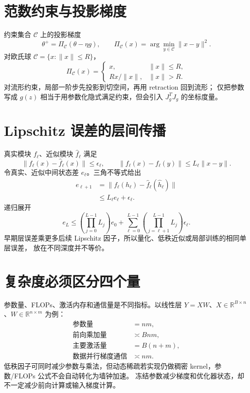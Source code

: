 \documentclass[11pt]{article}
\numberwithin{equation}{section}
\newcommand{\R}{\mathbb{R}}
\newcommand{\1}{\mathbf{1}}
\begin{document}
\section{范数约束与投影梯度}

约束集合 $\mathcal C$ 上的投影梯度
\begin{equation}
 \theta^+=\Pi_{\mathcal C}(\theta-\eta g),
 \qquad
 \Pi_{\mathcal C}(x)=\arg\min_{y\in\mathcal C}\|x-y\|^2.
\end{equation}
对欧氏球 $\mathcal C=\{x:\|x\|\le R\}$，
\begin{equation}
 \Pi_{\mathcal C}(x)=
 \begin{cases}
 x,&\|x\|\le R,\\
 Rx/\|x\|,&\|x\|>R.
 \end{cases}
\end{equation}
对流形约束，局部一阶步先投影到切空间，再用 retraction 回到流形；
仅把参数写成 $g(z)$ 相当于用参数化隐式满足约束，但会引入 $J_g^TJ_g$ 的坐标度量。

\section{Lipschitz 误差的层间传播}

真实模块 $f_\ell$、近似模块 $\widehat f_\ell$ 满足
\begin{equation}
 \|f_\ell(x)-\widehat f_\ell(x)\|\le\epsilon_\ell,
 \qquad
 \|f_\ell(x)-f_\ell(y)\|\le L_\ell\|x-y\|.
\end{equation}
令真实、近似中间状态差 $e_\ell$。三角不等式给出
\begin{align}
 e_{\ell+1}
 &=\|f_\ell(h_\ell)-\widehat f_\ell(\widehat h_\ell)\|\\
 &\le L_\ell e_\ell+\epsilon_\ell.
\end{align}
递归展开
\begin{equation}
 e_L\le
 \left(\prod_{j=0}^{L-1}L_j\right)e_0
 +\sum_{\ell=0}^{L-1}
 \left(\prod_{j=\ell+1}^{L-1}L_j\right)\epsilon_\ell.
\end{equation}
早期层误差乘更多后续 Lipschitz 因子，所以量化、低秩近似或局部训练的相同单层误差，
放在不同深度并不等价。

\section{复杂度必须区分四个量}

参数量、FLOPs、激活内存和通信量是不同指标。以线性层
$Y=XW$、$X\in\R^{B\times n}$、$W\in\R^{n\times m}$ 为例：
\begin{align}
 \text{参数量}&=nm,\\
 \text{前向乘加量}&\asymp Bnm,\\
 \text{主要激活量}&=B(n+m),\\
 \text{数据并行梯度通信}&\asymp nm.
\end{align}
低秩因子可同时减少参数与乘法，但动态稀疏若实现仍做稠密 kernel，参数/FLOPs 公式不会自动转化为墙钟加速。
冻结参数减少梯度和优化器状态，却不一定减少前向计算或输入梯度计算。
\end{document}
